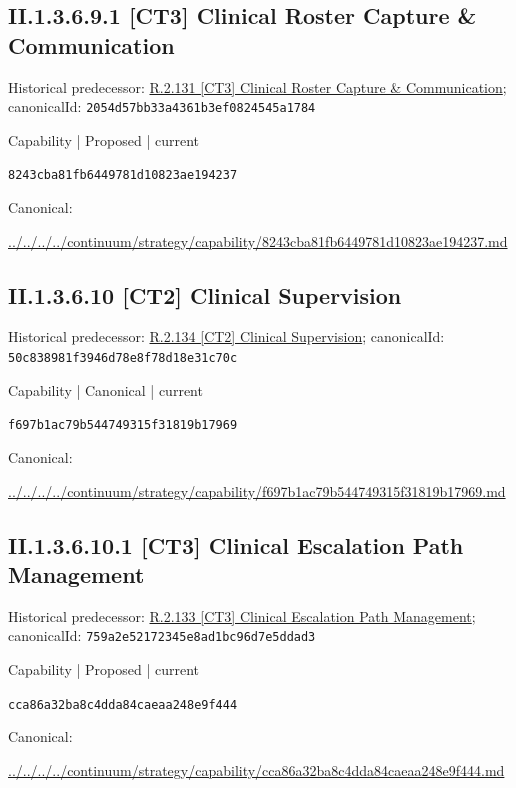 \documentclass[10pt,a4paper]{article}
\begin{document}
\subsection*{II.1.3.6.9.1 [CT3] Clinical Roster Capture \& Communication}
Historical predecessor: \hyperref[element-2054d57bb33a4361b3ef0824545a1784]{R.2.131 [CT3] Clinical Roster Capture \& Communication}; canonicalId: \texttt{2054d57bb33a4361b3ef0824545a1784}\par
\label{element-8243cba81fb6449781d10823ae194237}
{\small Capability | Proposed | current}\par
\texttt{8243cba81fb6449781d10823ae194237}\par
Canonical: \par
{\footnotesize\url{../../../../continuum/strategy/capability/8243cba81fb6449781d10823ae194237.md}}\par
\subsection*{II.1.3.6.10 [CT2] Clinical Supervision}
Historical predecessor: \hyperref[element-50c838981f3946d78e8f78d18e31c70c]{R.2.134 [CT2] Clinical Supervision}; canonicalId: \texttt{50c838981f3946d78e8f78d18e31c70c}\par
\label{element-f697b1ac79b544749315f31819b17969}
{\small Capability | Canonical | current}\par
\texttt{f697b1ac79b544749315f31819b17969}\par
Canonical: \par
{\footnotesize\url{../../../../continuum/strategy/capability/f697b1ac79b544749315f31819b17969.md}}\par
\subsection*{II.1.3.6.10.1 [CT3] Clinical Escalation Path Management}
Historical predecessor: \hyperref[element-759a2e52172345e8ad1bc96d7e5ddad3]{R.2.133 [CT3] Clinical Escalation Path Management}; canonicalId: \texttt{759a2e52172345e8ad1bc96d7e5ddad3}\par
\label{element-cca86a32ba8c4dda84caeaa248e9f444}
{\small Capability | Proposed | current}\par
\texttt{cca86a32ba8c4dda84caeaa248e9f444}\par
Canonical: \par
{\footnotesize\url{../../../../continuum/strategy/capability/cca86a32ba8c4dda84caeaa248e9f444.md}}\par
\end{document}
